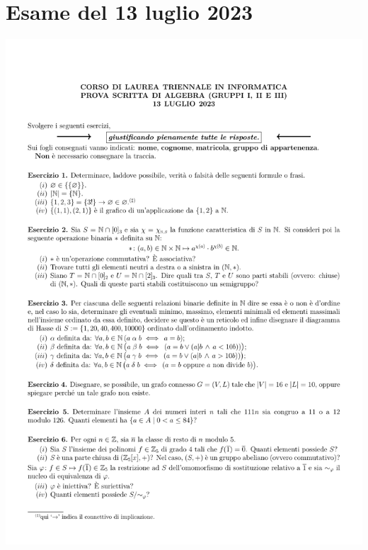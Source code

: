 \section{Esame del 13 luglio 2023}
\begin{center}
	\includegraphics[scale=.85]{pdf/23-07-13.pdf}
\end{center}
